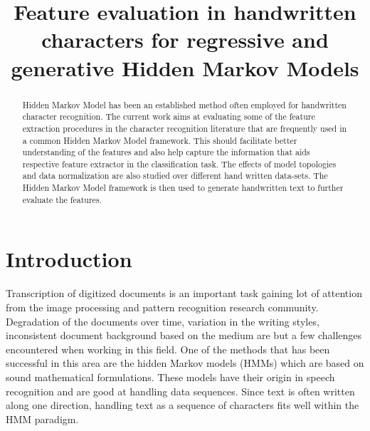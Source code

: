\documentclass[runningheads]{llncs}
\begin{document}
\pagestyle{headings}

\mainmatter

\title{Feature evaluation in handwritten characters for regressive and generative Hidden Markov Models}


\maketitle

\begin{abstract}
Hidden Markov Model has been an established method often employed for handwritten character recognition. The current work aims at evaluating some of the feature extraction procedures in the character recognition literature that are frequently used in a common Hidden Markov Model framework. This should facilitate better understanding of the features and also help capture the information that aids respective feature extractor in the classification task. The effects of model topologies and data normalization are also studied over different hand written data-sets. The Hidden Markov Model framework is then used to generate handwritten text to further evaluate the features.
\end{abstract}

\section{Introduction}
\label{sec:intro}
Transcription of digitized documents is an important task gaining lot of attention from the image processing and pattern recognition research community. Degradation of the documents over time, variation in the writing styles, inconsistent document background based on the medium are but a few challenges encountered when working in this field. One of the methods that has been successful in this area are the hidden Markov models (HMMs) \cite{Fink09} which are based on sound mathematical formulations. These models have their origin in speech recognition and are good at handling data sequences. Since text is often written along one direction, handling text as a sequence of characters fits well within the HMM paradigm.
\end{document}
